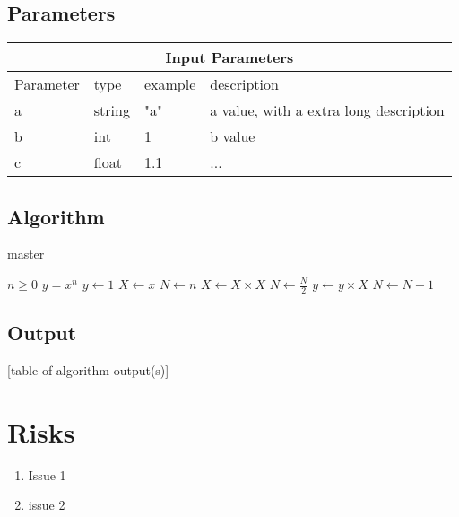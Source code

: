 \documentclass[11pt]{vantage6} %
\begin{document}
\subsection{Parameters}

\begin{tabular}{|l||l|l|l|}

 \hline
 \multicolumn{4}{|c|}{Input Parameters} \\
 \hline
 Parameter 	& type  	& example 	& description \\
 \hline
 a			& string    & "a" 		&  a value, with a extra long description\\
 b 			& int 		& 1 		&  b value\\
 c			& float		& 1.1 		&  ...\\
 \hline
\end{tabular}

\subsection{Algorithm}
\begin{algorithm}
\caption{master}\label{alg:cap}
\begin{algorithmic}
\Require $n \geq 0$
\Ensure $y = x^n$
\State $y \gets 1$
\State $X \gets x$
\State $N \gets n$
    \State $X \gets X \times X$
    \State $N \gets \frac{N}{2}$  
    \State $y \gets y \times X$
    \State $N \gets N - 1$
\EndIf
\EndWhile
\end{algorithmic}
\end{algorithm}

\subsection{Output}
[table of algorithm output(s)]


\section{Risks}

\begin{enumerate}
\item Issue 1
\item issue 2
\end{enumerate}
\end{document}
